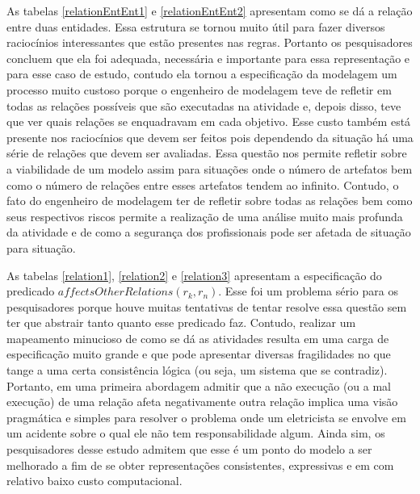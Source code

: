 As tabelas \ref{relationEntEnt1} e \ref{relationEntEnt2} apresentam como se dá a relação entre duas entidades. Essa estrutura se tornou muito útil para fazer diversos raciocínios interessantes
que estão presentes nas regras. Portanto os pesquisadores concluem que ela foi adequada, necessária e importante para essa representação e para esse caso de estudo, contudo ela tornou a 
especificação da modelagem um processo muito custoso porque o engenheiro de modelagem teve de refletir em todas as relações possíveis que são executadas na atividade e, depois disso, teve 
que ver quais relações se enquadravam em cada objetivo. Esse custo também está presente nos raciocínios que devem ser feitos pois dependendo da situação há uma série de relações que devem 
ser avaliadas. Essa questão nos permite refletir sobre a viabilidade de um modelo assim para situações onde o número de artefatos bem como o número de relações entre esses artefatos tendem ao 
infinito. Contudo, o fato do engenheiro de modelagem ter de refletir sobre todas as relações bem como seus respectivos riscos permite a realização de uma análise muito mais profunda 
da atividade e de como a segurança dos profissionais pode ser afetada de situação para situação. 

As tabelas \ref{relation1}, \ref{relation2} e \ref{relation3} apresentam a especificação do predicado $affectsOtherRelations(r_k,r_n)$. Esse foi um problema sério para os pesquisadores porque 
houve muitas tentativas de tentar resolve essa questão sem ter que abstrair tanto quanto esse predicado faz. Contudo, realizar um mapeamento minucioso de como se dá as atividades resulta 
em uma carga de especificação muito grande e que pode apresentar diversas fragilidades no que tange a uma certa consistência lógica (ou seja, um sistema que se contradiz). Portanto, 
em uma primeira abordagem admitir que a não execução (ou a mal execução) de uma relação afeta negativamente outra relação implica uma visão pragmática e simples para resolver o problema 
onde um eletricista se envolve em um acidente sobre o qual ele não tem responsabilidade algum. Ainda sim, os pesquisadores desse estudo admitem que esse é um ponto do modelo a ser melhorado 
a fim de se obter representações consistentes, expressivas e em com relativo baixo custo computacional. 

